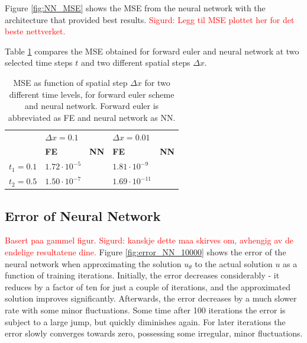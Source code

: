 \documentclass[12pt]{extarticle}
\begin{document}
Figure \ref{fig:NN_MSE} shows the MSE from the neural network with the architecture that provided best results. \textcolor{red}{Sigurd: Legg til MSE plottet her for det beste nettverket.}

Table \ref{tab:MSE_compare} compares the MSE obtained for forward euler and neural network at two selected time steps $t$ and two different spatial steps $\Delta x$. 


\begin{table}[h]
	\centering
	\begin{tabular}{l|ll|ll|}
		\cline{2-5}
		& \multicolumn{2}{l|}{\textbf{$\Delta x=0.1$}}           & \multicolumn{2}{l|}{\textbf{$\Delta x=0.01$}}           \\ \cline{2-5} 
		& \multicolumn{1}{l|}{\textbf{FE}}         & \textbf{NN} & \multicolumn{1}{l|}{\textbf{FE}}          & \textbf{NN} \\ \hline
		\multicolumn{1}{|l|}{\textbf{$t_1=0.1$}} & \multicolumn{1}{l|}{$1.72\cdot 10^{-5}$} &             & \multicolumn{1}{l|}{$1.81\cdot 10^{-9}$}  &             \\ \hline
		\multicolumn{1}{|l|}{\textbf{$t_2=0.5$}} & \multicolumn{1}{l|}{$1.50\cdot 10^{-7}$} &             & \multicolumn{1}{l|}{$1.69\cdot 10^{-11}$} &             \\ \hline
	\end{tabular}
\caption{MSE as function of spatial step $\Delta x$ for two different time levels, for forward euler scheme and neural network. Forward euler is abbreviated as FE and neural network as NN.}
\label{tab:MSE_compare}
\end{table}


\subsection*{Error of Neural Network}

\textcolor{red}{Basert paa gammel figur. Sigurd: kanskje dette maa skirves om, avhengig av de endelige resultatene dine.}
Figure \ref{fig:error_NN_10000} shows the error of the neural network when approximating the solution $u_{\theta}$ to the actual solution $u$ as a function of training iterations. Initially, the error decreases considerably - it reduces by a factor of ten for just a couple of iterations, and the approximated solution improves significantly. Afterwards, the error decreases by a much slower rate with some minor fluctuations. Some time after 100 iterations the error is subject to a large jump, but quickly diminishes again. For later iterations the error slowly converges towards zero, possessing some irregular, minor fluctuations. 
\end{document}
